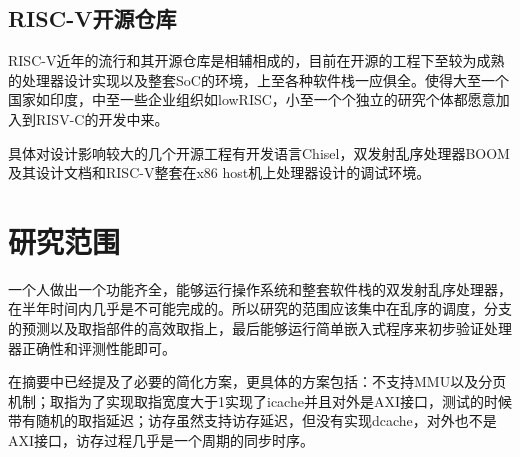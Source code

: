 	\subsection{RISC-V开源仓库}
	RISC-V近年的流行和其开源仓库是相辅相成的，目前在开源的工程下至较为成熟的处理器设计实现以及整套SoC的环境，上至各种软件栈一应俱全。使得大至一个国家如印度，中至一些企业组织如lowRISC，小至一个个独立的研究个体都愿意加入到RISV-C的开发中来。
	
	具体对设计影响较大的几个开源工程有开发语言Chisel，双发射乱序处理器BOOM及其设计文档和RISC-V整套在x86 host机上处理器设计的调试环境。
	
	\section{研究范围}
	
	一个人做出一个功能齐全，能够运行操作系统和整套软件栈的双发射乱序处理器，在半年时间内几乎是不可能完成的。所以研究的范围应该集中在乱序的调度，分支的预测以及取指部件的高效取指上，最后能够运行简单嵌入式程序来初步验证处理器正确性和评测性能即可。
	
	在摘要中已经提及了必要的简化方案，更具体的方案包括：不支持MMU以及分页机制；取指为了实现取指宽度大于1实现了icache并且对外是AXI接口，测试的时候带有随机的取指延迟；访存虽然支持访存延迟，但没有实现dcache，对外也不是AXI接口，访存过程几乎是一个周期的同步时序。
	